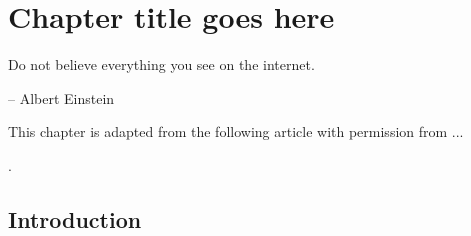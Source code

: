 \chapter{Chapter title goes here} \label{chap:chap-2}

\epigraph{Do not believe everything you see on the internet.}{-- Albert Einstein}



\begin{singlespace}         %
    This chapter is adapted from the following article with permission from ...
    
    . 
\end{singlespace} 


\section{Introduction}
\Blindtext[2]
